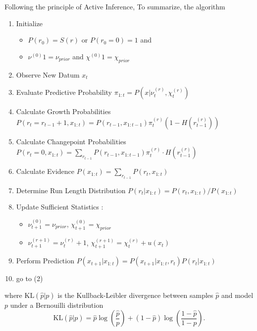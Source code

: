 \documentclass[profile,final,english, draft]{article}%
\newcommand{\KL}[2]{\text{KL}( #1 | #2 )}
\newcommand{\pa}[1]{\left( #1 \right)}
\begin{document}
Following the principle of Active Inference,
To summarize, the algorithm %

\begin{enumerate}
	\item     Initialize

	\begin{itemize}
		\item    $P(r_0)= S(r)$ or $P(r_0=0)=1$ and
		\item    $\nu^{(0)}1 = \nu_{prior}$ and $\chi^{(0)}1 = \chi_{prior}$
	\end{itemize}

	\item    Observe New Datum $x_t$
    \item    Evaluate Predictive Probability $\pi_{1:t} = P(x |\nu^{(r)}_t,\chi^{(r)}_t)$
    \item    Calculate Growth Probabilities $P(r_t=r_{t-1}+1, x_{1:t}) = P(r_{t-1}, x_{1:t-1}) \pi^{(r)}_t (1-H(r^{(r)}_{t-1}))$
    \item    Calculate Changepoint Probabilities $P(r_t=0, x_{1:t})= \sum_{r_{t-1}} P(r_{t-1}, x_{1:t-1}) \pi^{(r)}_t \cdot H(r^{(r)}_{t-1})$
    \item    Calculate Evidence $P(x_{1:t}) = \sum_{r_{t-1}} P (r_t, x_{1:t})$
    \item    Determine Run Length Distribution $P (r_t | x_{1:t}) = P (r_t, x_{1:t})/P (x_{1:t}) $
    \item    Update Sufficient Statistics :
	\begin{itemize}
		\item    $\nu^{(0)}_{t+1} = \nu_{prior}$, $\chi^{(0)}_{t+1} = \chi_{prior}$
		\item    $\nu^{(r+1)}_{t+1} = \nu^{(r)}_{t} +1$, $\chi^{(r+1)}_{t+1} = \chi^{(r)}_{t} + u(x_t)$
	\end{itemize}

    \item    Perform Prediction $P (x_{t+1} | x_{1:t}) = P (x_{t+1}|x_{1:t} , r_t) P (r_t|x_{1:t})$
    \item    go to (2)
\end{enumerate}


where $\KL{\hat p}{p}$ is the Kullback-Leibler divergence between samples $\hat p$ and model $p$ under a Bernouilli distribution
\begin{equation}
\KL{\hat p}{p} = \hat{p} \log\pa{\frac{\hat p}{p}} + (1-\hat p) \log\pa{\frac{1-\hat p}{1-p}}.
\end{equation}
\end{document}

